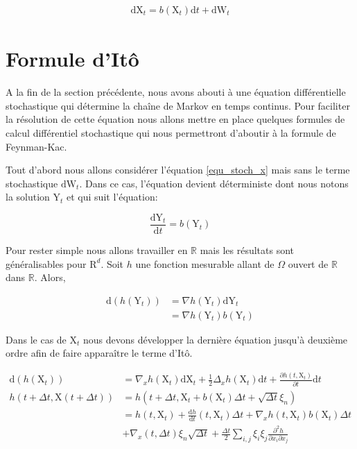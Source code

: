 \documentclass[11pt]{article}
\theoremstyle{definition}
\theoremstyle{remark}
\begin{document}
\begin{align}
\label{equ_stoch_x}
\mathrm{dX}_{t} = b(\mathrm{X}_{t})\mathrm{d}t + \mathrm{dW}_{t}
\end{align}


\section{Formule d'Itô}

A la fin de la section précédente, nous avons abouti à une équation différentielle stochastique qui détermine la chaîne de Markov en temps continus. Pour faciliter la résolution de cette équation nous allons mettre en place quelques formules de calcul différentiel stochastique qui nous permettront d'aboutir à la formule de Feynman-Kac. 

Tout d'abord nous allons considérer l’équation \ref{equ_stoch_x} mais sans le terme stochastique $\mathrm{dW}_{t}$. Dans ce cas, l'équation devient déterministe dont nous notons la solution $\mathrm{Y}_t$ et qui suit l'équation:

\[ \frac{\mathrm{dY}_{t}}{\mathrm{d}t} = b(\mathrm{Y}_t) \]

Pour rester simple nous allons travailler en $\mathbb{R}$ mais les résultats sont généralisables pour $\mathrm{R}^d$. Soit $h$ une fonction mesurable allant de $\Omega$ ouvert de $\mathbb{R}$ dans $\mathbb{R}$. Alors, 

\begin{align*}
\mathrm{d}(h(\mathrm{Y}_{t})) &= \nabla h(\mathrm{Y}_{t}) \mathrm{dY}_{t} \\
&= \nabla h(\mathrm{Y}_{t}) b(\mathrm{Y}_{t})
\end{align*}

Dans le cas de $\mathrm{X}_{t}$ nous devons développer la dernière équation jusqu'à deuxième ordre afin de faire apparaître le terme d'Itô. 

\begin{align}
\label{develop_ito_x}
\mathrm{d}(h(\mathrm{X}_{t})) &= \nabla_{x} h(\mathrm{X}_{t}) \mathrm{dX}_{t} + \frac{1}{2} \Delta_{x} h(\mathrm{X}_{t}) \mathrm{d}t + \frac{\partial h(t, \mathrm{X}_{t})}{\partial t}\mathrm{d}t \\
h(t+\Delta t, \mathrm{X}(t+\Delta t)) &= h(t+\Delta t, \mathrm{X}_{t} + b(\mathrm{X}_{t})\Delta t + \sqrt{\Delta t} \xi_{n}) \\
&= h(t, \mathrm{X}_{t}) + \frac{\mathrm{d}h}{\mathrm{d}t}(t,\mathrm{X}_{t})\Delta t + \nabla_{x} h(t, \mathrm{X}_{t})  b(\mathrm{X}_{t}) \Delta t \\
&+ \nabla_{x} (t, \Delta t) \xi_{n} \sqrt{\Delta t} + \frac{\Delta t}{2} \sum_{i,j} \xi_{i} \xi_{j} \frac{\partial^2 h}{\partial x_i \partial x_j}
\end{align}
\end{document}
